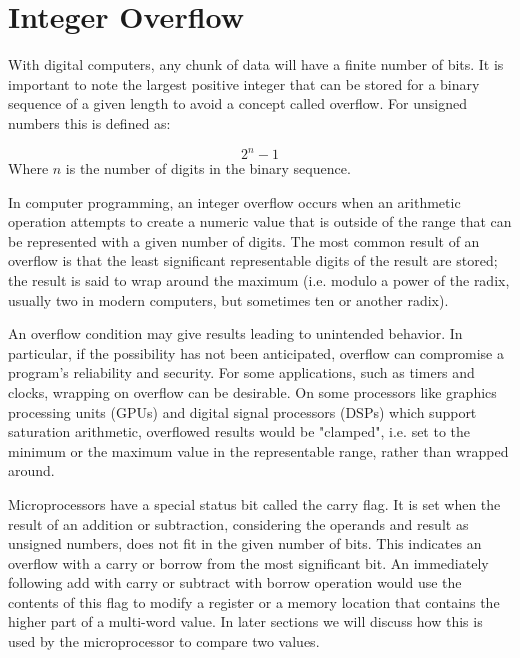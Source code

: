 \section{Integer Overflow\label{sec:data:overflow}}
With digital computers, any chunk of data will have a finite number of bits. It is important to note the largest positive 
integer that can be stored for a binary sequence of a given length to avoid a concept called \gls{overflow}. 
For \gls{unsigned} numbers this is defined as: %

%
\begin{equation} \label{eq:sizeofunsignedint}
    2^n - 1
\end{equation}
%
Where $n$ is the number of digits in the binary sequence.

In computer programming, an integer overflow occurs when an arithmetic operation attempts to create a numeric value that is 
outside of the range that can be represented with a given number of digits. The most common result of an overflow is that the 
least significant representable digits of the result are stored; the result is said to wrap around the maximum (i.e. modulo a 
power of the radix, usually two in modern computers, but sometimes ten or another radix).

An overflow condition may give results leading to unintended behavior. In particular, if the possibility has not been anticipated, 
overflow can compromise a program's reliability and security. For some applications, such as timers and clocks, wrapping on 
overflow can be desirable. On some processors like graphics processing units (GPUs) and digital signal processors (DSPs) which 
support saturation arithmetic, overflowed results would be "clamped", i.e. set to the minimum or the maximum value in the 
representable range, rather than wrapped around. 

Microprocessors have a special status bit called the carry flag. It is set when the result of an addition or subtraction, 
considering the operands and result as unsigned numbers, does not fit in the given number of bits. This indicates an overflow 
with a carry or borrow from the most significant bit. An immediately following add with carry or subtract with borrow operation 
would use the contents of this flag to modify a register or a memory location that contains the higher part of a multi-word value. 
In later sections we will discuss how this is used by the microprocessor to compare two values.


\begin{figure}[h]
\end{figure}

